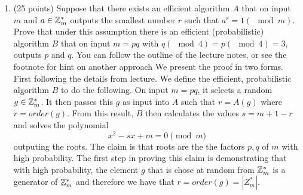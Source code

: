 \documentclass{article}
\begin{document}
\begin{enumerate}[noitemsep,topsep=\mdcompacttopsep]%

\item{}
(25 points) Suppose that there exists an efficient algorithm $A$ that on input $m$ and $a \in \mathbb{Z}^*_m$ outputs the smallest number $r$ such that $a^r = 1 (\mod m)$. Prove that under this assumption there is an efficient (probabilistic) algorithm $B$ that on input $m=pq$ with $q (\mod 4) = p (\mod 4)=3$, outputs $p$ and $q$. You can follow the outline of the lecture notes, or see the footnote for hint on another approach%
We present the proof in two forms. First following the details from lecture. 
We define the efficient, probabilistic algorithm $B$ to do the following. On input $m = pq$, it selects
a random $g \in \mathbb{Z}_m^*$. It then passes this $g$ as input into $A$ such that $r = A(g)$ where $r = order(g)$. 
From this result, $B$ then calculates the values $s = m + 1 - r$ and solves the polynomial
\noindent\noindent\[%
x^2 - sx + m = 0 \pmod m
\]%
outputing the roots. The claim is that roots are the the factors $p,q$ of
$m$ with high probability. The first step in proving this claim is demonstrating that with high
probability, the element $g$ that is chose at random from $\mathbb{Z}_m^*$ is a generator of $\mathbb{Z}_m^*$ and 
therefore we have that $r = order(g) = |Z_m^*|$.


\end{enumerate}
\end{document}
